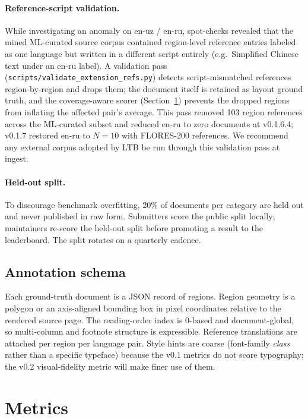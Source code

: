\documentclass[11pt]{article}
\begin{document}
\paragraph{Reference-script validation.} While investigating an anomaly on
en-uz / en-ru, spot-checks revealed that the mined ML-curated source corpus
contained region-level reference entries labeled as one language but written in
a different script entirely (e.g.\ Simplified Chinese text under an en-ru
label). A validation pass (\texttt{scripts/validate\_extension\_refs.py})
detects script-mismatched references region-by-region and drops them; the
document itself is retained as layout ground truth, and the coverage-aware
scorer (Section~\ref{sec:metrics}) prevents the dropped regions from inflating
the affected pair's average. This pass removed 103 region references across the
ML-curated subset and reduced en-ru to zero documents at v0.1.6.4; v0.1.7
restored en-ru to $N=10$ with FLORES-200 references. We recommend any external
corpus adopted by LTB be run through this validation pass at ingest.

\paragraph{Held-out split.} To discourage benchmark overfitting, 20\% of
documents per category are held out and never published in raw form. Submitters
score the public split locally; maintainers re-score the held-out split before
promoting a result to the leaderboard. The split rotates on a quarterly cadence.

\subsection{Annotation schema}

Each ground-truth document is a JSON record of regions. Region geometry is a
polygon or an axis-aligned bounding box in pixel coordinates relative to the
rendered source page. The reading-order index is 0-based and document-global, so
multi-column and footnote structure is expressible. Reference translations are
attached per region per language pair. Style hints are coarse (font-family
\emph{class} rather than a specific typeface) because the v0.1 metrics do not
score typography; the v0.2 visual-fidelity metric will make finer use of them.

\section{Metrics}
\label{sec:metrics}
\end{document}
